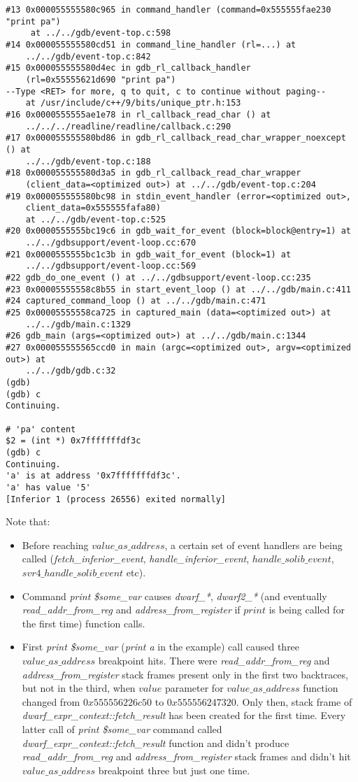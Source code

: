 \documentclass{report}
\begin{document}
\begin{verbatim}
#13 0x000055555580c965 in command_handler (command=0x555555fae230 "print pa")
     at ../../gdb/event-top.c:598
#14 0x000055555580cd51 in command_line_handler (rl=...) at 
    ../../gdb/event-top.c:842
#15 0x000055555580d4ec in gdb_rl_callback_handler 
    (rl=0x55555621d690 "print pa")
--Type <RET> for more, q to quit, c to continue without paging--
    at /usr/include/c++/9/bits/unique_ptr.h:153
#16 0x0000555555ae1e78 in rl_callback_read_char () at 
    ../../../readline/readline/callback.c:290
#17 0x000055555580bd86 in gdb_rl_callback_read_char_wrapper_noexcept () at 
    ../../gdb/event-top.c:188
#18 0x000055555580d3a5 in gdb_rl_callback_read_char_wrapper 
    (client_data=<optimized out>) at ../../gdb/event-top.c:204
#19 0x000055555580bc98 in stdin_event_handler (error=<optimized out>, 
    client_data=0x555555fafa80)
    at ../../gdb/event-top.c:525
#20 0x0000555555bc19c6 in gdb_wait_for_event (block=block@entry=1) at 
    ../../gdbsupport/event-loop.cc:670
#21 0x0000555555bc1c3b in gdb_wait_for_event (block=1) at 
    ../../gdbsupport/event-loop.cc:569
#22 gdb_do_one_event () at ../../gdbsupport/event-loop.cc:235
#23 0x00005555558c8b55 in start_event_loop () at ../../gdb/main.c:411
#24 captured_command_loop () at ../../gdb/main.c:471
#25 0x00005555558ca725 in captured_main (data=<optimized out>) at 
    ../../gdb/main.c:1329
#26 gdb_main (args=<optimized out>) at ../../gdb/main.c:1344
#27 0x000055555565ccd0 in main (argc=<optimized out>, argv=<optimized out>) at 
    ../../gdb/gdb.c:32
(gdb) 
(gdb) c
Continuing.

# 'pa' content
$2 = (int *) 0x7fffffffdf3c
(gdb) c
Continuing.
'a' is at address '0x7fffffffdf3c'.
'a' has value '5'
[Inferior 1 (process 26556) exited normally] 
\end{verbatim}
Note that:
\begin{itemize}
\item Before reaching  $value\_as\_address$, a certain set of event handlers are being called (\textit{fetch\_inferior\_event}, \textit{handle\_inferior\_event}, $handle\_solib\_event$, $svr4\_handle\_solib\_event$ etc). 
\item Command \textit{print \$some\_var} causes \textit{dwarf\_*}, \textit{dwarf2\_*} (and eventually \textit{read\_addr\_from\_reg} and \textit{address\_from\_register} if $print$ is being called for the first time) function calls.
\item First \textit{print \$some\_var} (\textit{print a} in the example) call caused three $value\_as\_address$ breakpoint hits. There were \textit{read\_addr\_from\_reg} and \textit{address\_from\_register} stack frames present only in the first two backtraces, but not in the third, when $value$ parameter for $value\_as\_address$ function changed from $0x555556226c50$ to $0x555556247320$.
Only then, stack frame of \textit{dwarf\_expr\_context::fetch\_result} has been created for the first time.
Every latter call of \textit{print \$some\_var} command called \textit{dwarf\_expr\_context::fetch\_result} function and didn't produce \textit{read\_addr\_from\_reg} and \textit{address\_from\_register} stack frames and didn't hit $value\_as\_address$ breakpoint three but just one time.
\end{itemize}
\end{document}
